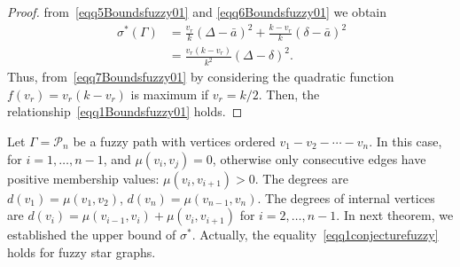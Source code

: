 \documentclass[12pt]{amsart}
\newcommand{\SF}{\sigma^*}
\begin{document}
\begin{proof}
from~\eqref{eqq5Boundsfuzzy01} and \eqref{eqq6Boundsfuzzy01} we obtain 
\begin{equation}~\label{eqq7Boundsfuzzy01}
\begin{aligned}
\SF(\Gamma)&=\frac{v_r}{k}\left(\Delta-\bar{a}\right)^2+\frac{k-v_r}{k}\left(\delta-\bar{a}\right)^2\\
&=\frac{v_r(k-v_r)}{k^2}(\Delta-\delta)^2.
\end{aligned}
\end{equation}
Thus, from~\eqref{eqq7Boundsfuzzy01} by considering the quadratic function $f(v_r)=v_r(k-v_r)$ is maximum if $v_r=k/2$. Then,  the relationship~\eqref{eqq1Boundsfuzzy01} holds.
\end{proof}

Let $\Gamma=\mathcal{P}_n$ be a fuzzy path with vertices ordered $v_1-v_2-\cdots-v_n$. In this case, for $i=1,\dots,n-1$, and $\mu(v_i,v_j)=0$, otherwise only consecutive edges have positive membership values: 
$\mu(v_i, v_{i+1}) > 0$.  The degrees are $d(v_1) = \mu(v_1,v_2)$, \quad $d(v_n) = \mu(v_{n-1},v_n)$. The  degrees of internal vertices are  $d(v_i) = \mu(v_{i-1},v_i) + \mu(v_i,v_{i+1})$ for $i=2,\dots,n-1$.
In next theorem, we established the upper bound of $\SF$. Actually, the equality~\eqref{eqq1conjecturefuzzy} holds for fuzzy star graphs.
\end{document}
